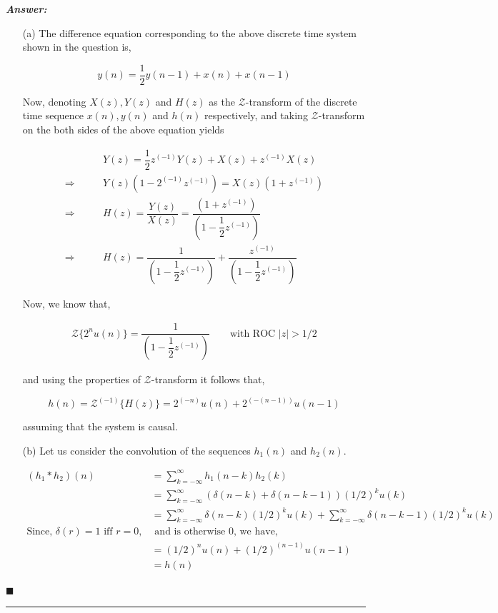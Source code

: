 \documentclass[12pt]{article}
\theoremstyle{definition}
\newenvironment{answer}{
    \textbf{\textit{Answer:}} \qquad
}{\hfill $\blacksquare$ \\ 

\begin{center}
    \rule{0.8\linewidth}{1.5px} 
    \vspace*{1cm}   
\end{center}
}
\newcommand{\zcal}{\mathcal{Z}}
\newcommand{\inv}[1][1]{^{(- #1)}}
\begin{document}
\begin{answer}
    \begin{enumerate}
        \item[(a)] The difference equation corresponding to the above discrete time system shown in the question is,

        $$
        y(n) = \dfrac{1}{2} y(n-1) + x(n) + x(n-1)
        $$
    
        Now, denoting $X(z), Y(z)$ and $H(z)$ as the $\zcal$-transform of the discrete time sequence $x(n), y(n)$ and $h(n)$ respectively, and taking $\zcal$-transform on the both sides of the above equation yields
    
        \begin{align*}
            & Y(z) = \dfrac{1}{2} z\inv Y(z) + X(z) + z\inv X(z)\\
            \Rightarrow \qquad & Y(z)(1 - 2\inv z\inv) = X(z)(1 + z\inv)\\
            \Rightarrow \qquad & H(z) = \dfrac{Y(z)}{X(z)} = \dfrac{(1 + z\inv)}{\left(1 - \dfrac{1}{2} z\inv\right)}\\
            \Rightarrow \qquad & H(z) =  \dfrac{1}{\left(1 - \dfrac{1}{2} z\inv\right)} +  \dfrac{z\inv}{\left(1 - \dfrac{1}{2} z\inv\right)}
        \end{align*}
    
        Now, we know that,
    
        \begin{align*}
            \zcal\{  2^n u(n) \} = \dfrac{1}{\left(1 - \dfrac{1}{2} z\inv\right)} \qquad \text{with ROC }  \vert z \vert > 1/2
        \end{align*}
    
        and using the properties of $\zcal$-transform it follows that, 
    
        $$
        h(n) = \zcal\inv\{ H(z)\} = 2\inv[n] u(n) + 2\inv[(n-1)] u(n-1)
        $$

        assuming that the system is causal.
        
    \item[(b)] Let us consider the convolution of the sequences $h_1(n)$ and $h_2(n)$. 
    
    \begin{align*}
        (h_1 \ast h_2) (n)
        & = \sum_{k = -\infty}^{\infty} h_1(n - k) h_2(k)\\
        & = \sum_{k = -\infty}^{\infty} (\delta(n-k) + \delta(n-k-1)) (1/2)^k u(k)\\
        & = \sum_{k = -\infty}^{\infty} \delta(n-k) (1/2)^k u(k) + \sum_{k = -\infty}^{\infty} \delta(n-k-1) (1/2)^k u(k)\\
        \text{Since, } \delta(r) = 1 \text{ iff } r = 0, & \text{ and is otherwise 0, we have, }\\
        & = (1/2)^n u(n) + (1/2)^{(n-1)} u(n-1)\\
        & = h(n)
    \end{align*}

    \end{enumerate}
\end{answer}
\end{document}
